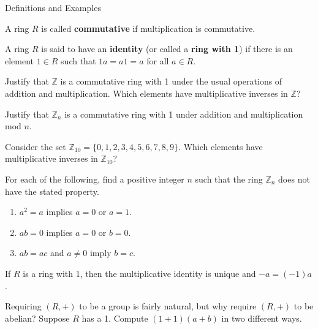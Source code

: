 \begin{section}{Definitions and Examples}
\begin{definition}
A ring $R$ is called \textbf{commutative} if multiplication is commutative.
\end{definition}

\begin{definition}
A ring $R$ is said to have an \textbf{identity} (or called a \textbf{ring with  1}) if there is an element $1\in R$ such that $1a=a 1=a$ for all $a\in R$.
\end{definition}

\begin{problem}
Justify that $\mathbb{Z}$ is a commutative ring with 1 under the usual operations of addition and multiplication. Which elements have multiplicative inverses in $\mathbb{Z}$?
\end{problem}

\begin{problem}
Justify that $\mathbb{Z}_n$ is a commutative ring with 1 under addition and multiplication mod $n$.
\end{problem}

\begin{problem}\label{prob:Z10Ring}
Consider the set $\mathbb{Z}_{10}=\{0,1,2,3,4,5,6,7,8,9\}$. Which elements have multiplicative inverses in $\mathbb{Z}_{10}$?
\end{problem}

\begin{problem}
For each of the following, find a positive integer $n$ such that the ring $\mathbb{Z}_n$ does not have the stated property.
\begin{enumerate}[label=\rm{(\alph*)}]
\item $a^2=a$ implies $a=0$ or $a=1$.
\item $ab=0$ implies $a=0$ or $b=0$.
\item $ab=ac$ and $a\neq 0$ imply $b=c$.
\end{enumerate}
\end{problem}

\begin{theorem}
If $R$ is a ring with 1, then the multiplicative identity is unique and $-a=(-1)a$.
\end{theorem}

\begin{problem}
Requiring $(R,+)$ to be a group is fairly natural, but why require $(R,+)$ to be abelian?  Suppose $R$ has a 1.  Compute $(1+1)(a+b)$ in two different ways.
\end{problem}


\end{section}
